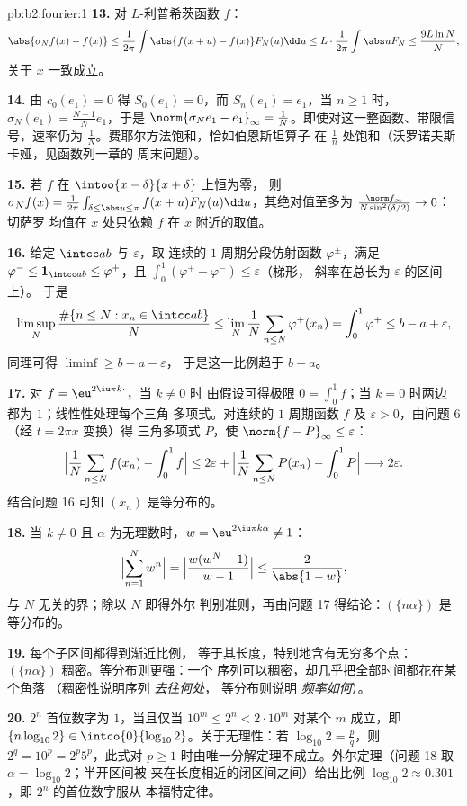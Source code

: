 \begin{solution}{pb:b2:fourier:1}
\textbf{13.} 对 $L$-利普希茨函数 $f$：
\[
\abs{\sigma_Nf(x) - f(x)}
\leq \frac{1}{2\pi}\int\abs{f(x+u) - f(x)}F_N(u)\dd u
\leq L\cdot\frac{1}{2\pi}\int\abs uF_N
\leq \frac{9L\ln N}{N},
\]
关于 $x$ 一致成立。

\textbf{14.} 由 $c_0(e_1) = 0$ 得 $S_0(e_1) = 0$，而
$S_n(e_1) = e_1$，当 $n \geq 1$ 时，$\sigma_N(e_1) =
\frac{N-1}{N}e_1$，于是 $\norm{\sigma_Ne_1 - e_1}_\infty =
\frac1N$。即使对这一整函数、带限信号，速率仍为
$\frac1N$。费耶尔方法饱和，恰如伯恩斯坦算子
在 $\frac1n$ 处饱和（沃罗诺夫斯卡娅，见函数列一章的
周末问题）。

\textbf{15.} 若 $f$ 在 $\intoo{x-\delta}{x+\delta}$ 上恒为零，
则 $\sigma_Nf(x) = \frac{1}{2\pi}\int_{\delta \leq \abs u
\leq \pi}f(x+u)F_N(u)\dd u$，其绝对值至多为
$\frac{\norm f_\infty}{N\sin^2(\delta/2)} \to 0$：切萨罗
均值在 $x$ 处只依赖 $f$ 在 $x$ 附近的取值。

\textbf{16.} 给定 $\intcc ab$ 与 $\varepsilon$，取
连续的 $1$ 周期分段仿射函数 $\varphi^\pm$，满足
$\varphi^- \leq \mathbf 1_{\intcc ab} \leq \varphi^+$，且
$\int_0^1(\varphi^+ - \varphi^-) \leq \varepsilon$（梯形，
斜率在总长为 $\varepsilon$ 的区间上）。
于是
\[
\limsup_N\frac{\#\{n \leq N : x_n \in \intcc ab\}}{N}
\leq \lim_N\frac1N\sum_{n\leq N}\varphi^+(x_n)
= \int_0^1\varphi^+ \leq b - a + \varepsilon ,
\]
同理可得 $\liminf \geq b - a - \varepsilon$，
于是这一比例趋于 $b - a$。

\textbf{17.} 对 $f = \eu^{2\iu\pi k\cdot}$，当 $k \neq 0$ 时
由假设可得极限 $0 = \int_0^1f$；当 $k = 0$ 时两边
都为 $1$；线性性处理每个三角
多项式。对连续的 $1$ 周期函数 $f$ 及 $\varepsilon >
0$，由问题 6（经 $t = 2\pi x$ 变换）得
三角多项式 $P$，使 $\norm{f - P}_\infty \leq
\varepsilon$：
\[
\Bigl|\frac1N\sum_{n\leq N}f(x_n) - \int_0^1f\Bigr|
\leq 2\varepsilon +
\Bigl|\frac1N\sum_{n\leq N}P(x_n) - \int_0^1P\Bigr|
\longrightarrow 2\varepsilon .
\]
结合问题 16 可知 $(x_n)$ 是等分布的。

\textbf{18.} 当 $k \neq 0$ 且 $\alpha$ 为无理数时，$w =
\eu^{2\iu\pi k\alpha} \neq 1$：
\[
\Bigl|\sum_{n=1}^{N}w^n\Bigr|
= \Bigl|\frac{w(w^N - 1)}{w - 1}\Bigr|
\leq \frac{2}{\abs{1 - w}} ,
\]
与 $N$ 无关的界；除以 $N$ 即得外尔
判别准则，再由问题 17 得结论：$(\{n\alpha\})$ 是
等分布的。

\textbf{19.} 每个子区间都得到渐近比例，
等于其长度，特别地含有无穷多个点：
$(\{n\alpha\})$ 稠密。等分布则更强：一个
序列可以稠密，却几乎把全部时间都花在某个角落
（稠密性说明序列 \emph{去往何处}，
等分布则说明 \emph{频率如何}）。

\textbf{20.} $2^n$ 首位数字为 $1$，当且仅当 $10^m \leq 2^n <
2\cdot10^m$ 对某个 $m$ 成立，即 $\{n\log_{10}2\} \in
\intco{0}{\log_{10}2}$。关于无理性：若 $\log_{10}2 =
\frac pq$，则 $2^q = 10^p = 2^p5^p$，此式对 $p
\geq 1$ 时由唯一分解定理不成立。外尔定理（问题 18
取 $\alpha = \log_{10}2$；半开区间被
夹在长度相近的闭区间之间）给出比例
$\log_{10}2 \approx 0.301$，即 $2^n$ 的首位数字服从
本福特定律。


\end{solution}
